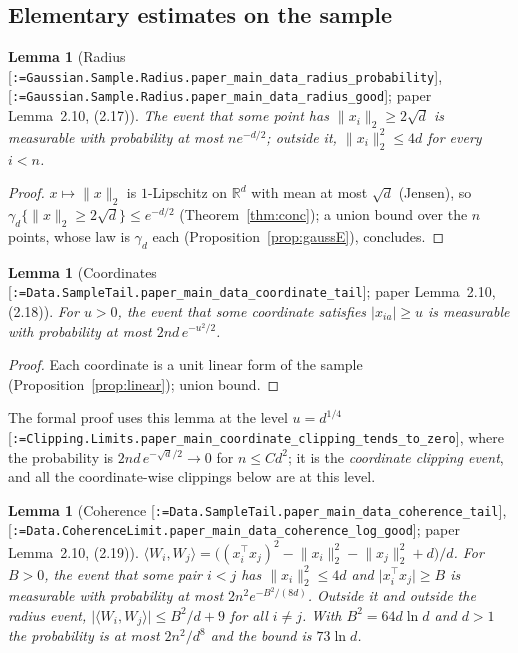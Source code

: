 \documentclass[11pt]{article}
\makeatletter
\newcommand{\formal@break}[1]{\@tfor\formal@tok:=#1\do{%
  \formal@tok
  \expandafter\ifx\formal@tok.\allowbreak\else
  \expandafter\ifx\formal@tok\_\allowbreak\fi\fi}}
\DeclareRobustCommand{\formal}[1]{\textnormal{[\texttt{\small\formal@break{#1}}]}}
\newcommand{\R}{\mathbb{R}}
\newcommand{\ip}[2]{\langle #1, #2\rangle}
\newcommand{\norm}[1]{\lVert #1\rVert}
\newcommand{\abs}[1]{\lvert #1\rvert}
\newcommand{\sqd}{\sqrt{d}}
\newcommand{\gauss}{\gamma}
\theoremstyle{plain}
\newtheorem{lemma}[theorem]{Lemma}
\theoremstyle{definition}
\makeatother
\begin{document}
\subsection{Elementary estimates on the sample}\label{sec:data}

\begin{lemma}[Radius \formal{Gaussian.Sample.Radius.paper\_main\_data\_radius\_probability}, \formal{Gaussian.Sample.Radius.paper\_main\_data\_radius\_good}; paper Lemma~2.10, (2.17)]\label{lem:radius}
The event that some point has $\norm{x_i}_2 \ge 2\sqd$ is measurable with
probability at most $n e^{-d/2}$; outside it, $\norm{x_i}_2^2 \le 4d$ for
every $i < n$.
\end{lemma}

\begin{proof}
$x \mapsto \norm{x}_2$ is $1$-Lipschitz on $\R^d$ with mean at most $\sqd$
(Jensen), so $\gauss_d\{\norm{x}_2 \ge 2\sqd\} \le e^{-d/2}$
(Theorem~\ref{thm:conc}); a union bound over the $n$ points, whose law is
$\gauss_d$ each (Proposition~\ref{prop:gaussE}), concludes.
\end{proof}

\begin{lemma}[Coordinates \formal{Data.SampleTail.paper\_main\_data\_coordinate\_tail}; paper Lemma~2.10, (2.18)]\label{lem:coord}
For $u > 0$, the event that some coordinate satisfies $\abs{x_{ia}} \ge u$
is measurable with probability at most $2nd\, e^{-u^2/2}$.
\end{lemma}

\begin{proof}
Each coordinate is a unit linear form of the sample (Proposition~\ref{prop:linear});
union bound.
\end{proof}

The formal proof uses this lemma at the level $u = d^{1/4}$
\formal{Clipping.Limits.paper\_main\_coordinate\_clipping\_tends\_to\_zero},
where the probability is $2nd\,e^{-\sqd/2} \to 0$ for $n \le Cd^2$; it is
the \emph{coordinate clipping event}, and all the coordinate-wise clippings
below are at this level.

\begin{lemma}[Coherence \formal{Data.SampleTail.paper\_main\_data\_coherence\_tail}, \formal{Data.CoherenceLimit.paper\_main\_data\_coherence\_log\_good}; paper Lemma~2.10, (2.19)]\label{lem:coherence}
$\ip{W_i}{W_j} = \bigl((x_i^{\top}x_j)^2 - \norm{x_i}_2^2 - \norm{x_j}_2^2 + d\bigr)/d$.
For $B > 0$, the event that some pair $i < j$ has $\norm{x_i}_2^2 \le 4d$ and
$\abs{x_i^{\top}x_j} \ge B$ is measurable with probability at most
$2n^2 e^{-B^2/(8d)}$. Outside it and outside the radius event,
$\abs{\ip{W_i}{W_j}} \le B^2/d + 9$ for all $i \ne j$. With
$B^2 = 64d\ln d$ and $d > 1$ the probability is at most $2n^2/d^8$ and the
bound is $73\ln d$.
\end{lemma}
\end{document}
